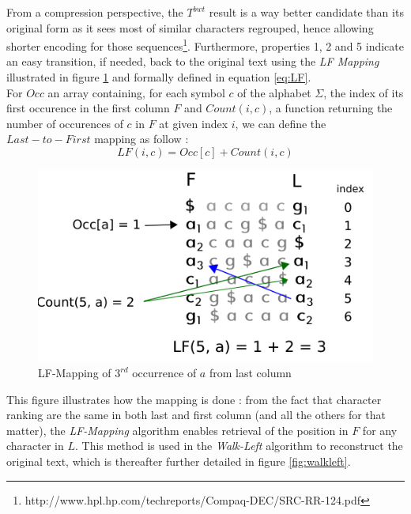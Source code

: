 From a compression perspective, the $T^{bwt}$ result is a way better candidate than its original form as it sees most of similar characters regrouped, hence allowing shorter encoding for those sequences\footnote{http://www.hpl.hp.com/techreports/Compaq-DEC/SRC-RR-124.pdf}. Furthermore, properties 1, 2 and 5 indicate an easy transition, if needed, back to the original text  using the  \textsl{LF Mapping} illustrated in figure \ref{fig:LF} and formally defined in equation \ref{eq:LF}. \\

For $Occ$ an array containing, for each symbol $c$ of the alphabet $\Sigma$, the index of its first occurence in the first column $F$ and $Count(i, c)$, a function returning the number of occurences of $c$ in $F$ at given index $i$, we can define the $Last-to-First$ mapping as follow :
\begin{equation}
    LF(i, c) = Occ[c] + Count(i, c)
    \label{eq:LF}
\end{equation}


\begin{minipage}[t]{0.5\textwidth}
    \begin{figure}[H]
\hspace{-15mm}  \includegraphics[scale = 0.5]{Figures/LF.png}
  \caption{LF-Mapping of $3^{rd}$ occurrence of $a$ from last column}
    \label{fig:LF}
\end{figure}
\end{minipage}
\begin{minipage}[t]{0.4\textwidth}
        This figure illustrates how the mapping is done : from the fact that character ranking are the same in both last and first column (and all the others for that matter), the \textsl{LF-Mapping} algorithm enables retrieval of the position in $F$ for any character in $L$. This method is used in the \textsl{Walk-Left} algorithm to reconstruct the original text, which is thereafter further detailed in figure \ref{fig:walkleft}.
\end{minipage}
\vspace*{5mm}

